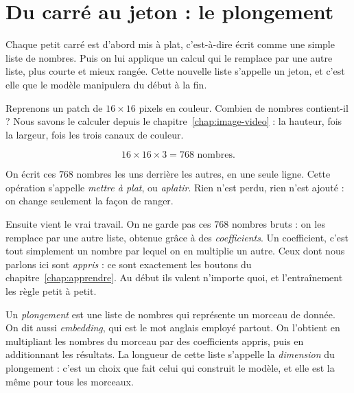 \section{Du carré au jeton : le plongement}

\begin{enclair}
Chaque petit carré est d'abord mis à plat, c'est-à-dire écrit comme une
simple liste de nombres. Puis on lui applique un calcul qui le remplace par
une autre liste, plus courte et mieux rangée. Cette nouvelle liste
s'appelle un jeton, et c'est elle que le modèle manipulera du début à la
fin.
\end{enclair}

Reprenons un patch de $16 \times 16$ pixels en couleur. Combien de nombres
contient-il ? Nous savons le calculer depuis le chapitre~\ref{chap:image-video} :
la hauteur, fois la largeur, fois les trois canaux de couleur.

\[
  16 \times 16 \times 3 = 768 \text{ nombres.}
\]

On écrit ces $768$ nombres les uns derrière les autres, en une seule ligne.
Cette opération s'appelle \emph{mettre à plat}, ou \emph{aplatir}. Rien n'est
perdu, rien n'est ajouté : on change seulement la façon de ranger.

Ensuite vient le vrai travail. On ne garde pas ces $768$ nombres bruts : on
les remplace par une autre liste, obtenue grâce à des \emph{coefficients}.
Un coefficient, c'est tout simplement un nombre par lequel on en multiplie
un autre. Ceux dont nous parlons ici sont \emph{appris} : ce sont exactement
les boutons du chapitre~\ref{chap:apprendre}. Au début ils valent n'importe
quoi, et l'entraînement les règle petit à petit.

\begin{definition}
Un \emph{plongement} est une liste de nombres qui représente un morceau de
donnée. On dit aussi \emph{embedding}, qui est le mot anglais employé
partout. On l'obtient en multipliant les nombres du morceau par des
coefficients appris, puis en additionnant les résultats. La longueur de cette
liste s'appelle la \emph{dimension} du plongement : c'est un choix que fait
celui qui construit le modèle, et elle est la même pour tous les morceaux.
\end{definition}

